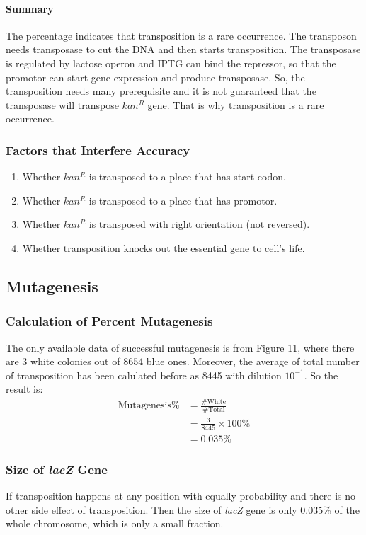 \documentclass{article}
\begin{document}
			\paragraph{Summary} The percentage indicates that transposition is a rare occurrence. The transposon needs transposase to cut the DNA and then starts transposition. The transposase is regulated by lactose operon and IPTG can bind the repressor, so that the promotor can start gene expression and produce transposase. So, the transposition needs many prerequisite and it is not guaranteed that the transposase will transpose $kan^R$ gene. That is why transposition is a rare occurrence.

			\subsubsection{Factors that Interfere Accuracy}
				\begin{enumerate}
					\item Whether $kan^R$ is transposed to a place that has start codon.
					\item Whether $kan^R$ is transposed to a place that has promotor.
					\item Whether $kan^R$ is transposed with right orientation (not reversed).
					\item Whether transposition knocks out the essential gene to cell's life.
				\end{enumerate}

		\subsection{Mutagenesis}
			\subsubsection{Calculation of Percent Mutagenesis}
				The only available data of successful mutagenesis is from Figure 11, where there are 3 white colonies out of 8654 blue ones. Moreover, the average of total number of transposition has been calulated before as 8445 with dilution $10 ^ {-1}$. So the result is:
				$$
				\begin{aligned}
				\text{Mutagenesis}\% &= \frac{\#\text{White}}{\#\text{Total}}\\
				&= \frac{3}{8445} \times 100 \%\\
				&= 0.035\%
				\end{aligned}
				$$
			\subsubsection{Size of \emph{lacZ} Gene}
				If transposition happens at any position with equally probability and there is no other side effect of transposition. Then the size of \emph{lacZ} gene is only 0.035\% of the whole chromosome, which is only a small fraction.
\end{document}
